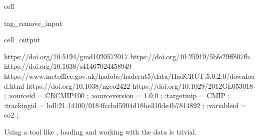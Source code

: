 \documentclass[letterpaper,10pt,english]{jupyterBook}
\begin{document}
\begin{sphinxuseclass}{cell}
\begin{sphinxuseclass}{tag_remove_input}
\begin{sphinxVerbatimOutput}
\begin{sphinxuseclass}{cell_output}
\begin{sphinxVerbatim}[commandchars=\\\{\}]
https://doi.org/10.5194/gmd\PYGZhy{}10\PYGZhy{}2057\PYGZhy{}2017 \PYGZhy{}\PYGZhy{}\PYGZhy{}
https://doi.org/10.25919/5bfe29ff807fb \PYGZhy{}\PYGZhy{}\PYGZhy{}
https://doi.org/10.1038/s41467\PYGZhy{}024\PYGZhy{}45894\PYGZhy{}9 \PYGZhy{}\PYGZhy{}\PYGZhy{}
https://www.metoffice.gov.uk/hadobs/hadcrut5/data/HadCRUT.5.0.2.0/download.html
\PYGZhy{}\PYGZhy{}\PYGZhy{} https://doi.org/10.1038/ngeo2422 \PYGZhy{}\PYGZhy{}\PYGZhy{} https://doi.org/10.1029/2012GL053018\PYGZdq{} ;
		:source\PYGZus{}id = \PYGZdq{}CR\PYGZhy{}CMIP\PYGZhy{}1\PYGZhy{}0\PYGZhy{}0\PYGZdq{} ;
		:source\PYGZus{}version = \PYGZdq{}1.0.0\PYGZdq{} ;
		:target\PYGZus{}mip = \PYGZdq{}CMIP\PYGZdq{} ;
		:tracking\PYGZus{}id =
\PYGZdq{}hdl:21.14100/0184fccb\PYGZhy{}d590\PYGZhy{}4d18\PYGZhy{}be31\PYGZhy{}0de4b7814892\PYGZdq{} ;
		:variable\PYGZus{}id = \PYGZdq{}co2\PYGZdq{} ;
\PYGZcb{}
\end{sphinxVerbatim}

\end{sphinxuseclass}\end{sphinxVerbatimOutput}

\end{sphinxuseclass}
\end{sphinxuseclass}
\sphinxAtStartPar
Using a tool like ,
loading and working with the data is trivial.
\end{document}
